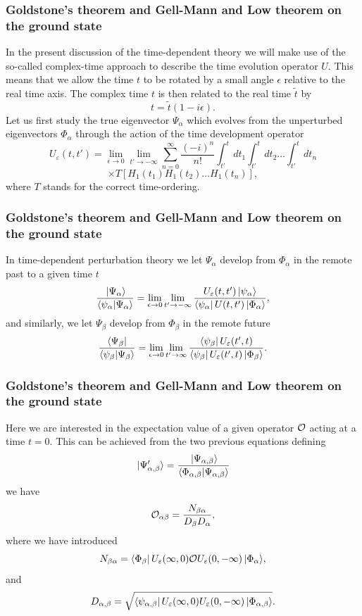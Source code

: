 \frame
{
\frametitle{Goldstone's theorem and Gell-Mann and Low theorem on the ground state}
\begin{small}
{\scriptsize
In the present discussion of the time-dependent theory we will make
use of the so-called complex-time approach to describe the time
evolution operator $U$.
This means that we
allow the time $t$ to be rotated by a small angle $\epsilon$
relative to the real time axis. The complex time $t$ is then
related to the real time $\tilde{t}$ by
\[
t=\tilde{t}(1-i\epsilon ).
\]
Let us first study the true eigenvector $\Psi_{\alpha}$ which evolves
from the unperturbed eigenvectors $\Phi_{\alpha}$ through the action of the
time development operator
\[
   U_{\varepsilon}(t,t')=\lim_{\epsilon \rightarrow 0}
   \lim_{t'\rightarrow -\infty}
   {\displaystyle\sum_{n=0}^{\infty}\frac{(-i)^n}{n!}
   \int_{t'}^{t}dt_1  \int_{t'}^{t}dt_2\dots  \int_{t'}^{t}dt_n}
\]
\[
	      \times T\left[H_1(t_1)H_1(t_2)\dots H_1(t_n)\right],
\]
where $T$ stands for the correct time-ordering.
}
\end{small}
}
\frame
{
\frametitle{Goldstone's theorem and Gell-Mann and Low theorem on the ground state}
\begin{small}
{\scriptsize
In time-dependent
perturbation theory we let $\Psi_{\alpha}$ develop from $\Phi_{\alpha}$ in the
remote past to a given time $t$
\[
    \frac{\,|{\Psi_{\alpha}}\rangle}
    {\left\langle\psi_{\alpha} | \Psi_{\alpha} \right\rangle}=
    \lim_{\epsilon \rightarrow 0}
   \lim_{t'\rightarrow -\infty}
   \frac{U_{\varepsilon}(t,t' )\,|{\psi_{\alpha}}\rangle }
   { \bra{\psi_{\alpha}} U(t,t' )\,|{\Phi_{\alpha}}\rangle },
\]
and similarly, we let
$\Psi_{\beta}$ develop from $\Phi_{\beta}$ in the remote future
\[
    \frac{\bra{\Psi_{\beta}}}{\left\langle
    \psi_{\beta} | \Psi_{\beta} \right\rangle}=
    \lim_{\epsilon \rightarrow 0}
    \lim_{t'\rightarrow \infty}
    \frac{\bra{\psi_{\beta}}U_{\varepsilon}(t' ,t) }
    { \bra{\psi_{\beta}} U_{\varepsilon}(t' ,t)\,|{\Phi_{\beta}}\rangle }.
\]
}
\end{small}
}
\frame
{
\frametitle{Goldstone's theorem and Gell-Mann and Low theorem on the ground state}
\begin{small}
{\scriptsize
Here we are interested in the expectation value of a given
operator ${\cal O}$ acting at a time $t=0$. This can be achieved
from the two previous equations defining
\[
     \,|{\Psi_{\alpha ,\beta}'}\rangle=
     \frac{\,|{\Psi_{\alpha ,\beta}}\rangle}
     {\left\langle\Phi_{\alpha ,\beta} | \Psi_{\alpha ,\beta} \right\rangle}
\]
we have
\[
   {\cal O}_{\alpha\beta}
  =\frac{N_{\beta\alpha}}{D_{\beta}D_{\alpha}},
\]
where we have introduced
\[
   N_{\beta\alpha}=
   \bra{\Phi_{\beta}}U_{\varepsilon}(\infty ,0){\cal O}U_{\varepsilon}(0,-\infty )\,|{\Phi_{\alpha}}\rangle ,
\]
and 
\[
   D_{\alpha ,\beta}=
   \sqrt{\bra{\psi_{\alpha ,\beta}}
   U_{\varepsilon}(\infty ,0)U_{\varepsilon}(0,-\infty )\,|{\Phi_{\alpha ,\beta}}\rangle}. 
\]
}
\end{small}
}
